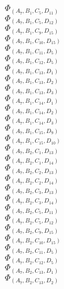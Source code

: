 \documentclass[14pt]{article}
\begin{document}
    $\Phi_{({A}_{7}, {B}_{1}, {C}_{5}, {D}_{11})}$ \\ 
    $\Phi_{({A}_{7}, {B}_{1}, {C}_{5}, {D}_{12})}$ \\ 
    $\Phi_{({A}_{7}, {B}_{1}, {C}_{9}, {D}_{15})}$ \\ 
    $\Phi_{({A}_{7}, {B}_{1}, {C}_{10}, {D}_{15})}$ \\ 
    $\Phi_{({A}_{7}, {B}_{1}, {C}_{11}, {D}_{5})}$ \\ 
    $\Phi_{({A}_{7}, {B}_{1}, {C}_{12}, {D}_{5})}$ \\ 
    $\Phi_{({A}_{7}, {B}_{1}, {C}_{13}, {D}_{1})}$ \\ 
    $\Phi_{({A}_{7}, {B}_{1}, {C}_{13}, {D}_{2})}$ \\ 
    $\Phi_{({A}_{7}, {B}_{1}, {C}_{13}, {D}_{3})}$ \\ 
    $\Phi_{({A}_{7}, {B}_{1}, {C}_{14}, {D}_{1})}$ \\ 
    $\Phi_{({A}_{7}, {B}_{1}, {C}_{14}, {D}_{2})}$ \\ 
    $\Phi_{({A}_{7}, {B}_{1}, {C}_{14}, {D}_{3})}$ \\ 
    $\Phi_{({A}_{7}, {B}_{1}, {C}_{15}, {D}_{9})}$ \\ 
    $\Phi_{({A}_{7}, {B}_{1}, {C}_{15}, {D}_{10})}$ \\ 
    $\Phi_{({A}_{7}, {B}_{2}, {C}_{1}, {D}_{13})}$ \\ 
    $\Phi_{({A}_{7}, {B}_{2}, {C}_{1}, {D}_{14})}$ \\ 
    $\Phi_{({A}_{7}, {B}_{2}, {C}_{2}, {D}_{13})}$ \\ 
    $\Phi_{({A}_{7}, {B}_{2}, {C}_{2}, {D}_{14})}$ \\ 
    $\Phi_{({A}_{7}, {B}_{2}, {C}_{3}, {D}_{13})}$ \\ 
    $\Phi_{({A}_{7}, {B}_{2}, {C}_{3}, {D}_{14})}$ \\ 
    $\Phi_{({A}_{7}, {B}_{2}, {C}_{5}, {D}_{11})}$ \\ 
    $\Phi_{({A}_{7}, {B}_{2}, {C}_{5}, {D}_{12})}$ \\ 
    $\Phi_{({A}_{7}, {B}_{2}, {C}_{9}, {D}_{15})}$ \\ 
    $\Phi_{({A}_{7}, {B}_{2}, {C}_{10}, {D}_{15})}$ \\ 
    $\Phi_{({A}_{7}, {B}_{2}, {C}_{11}, {D}_{5})}$ \\ 
    $\Phi_{({A}_{7}, {B}_{2}, {C}_{12}, {D}_{5})}$ \\ 
    $\Phi_{({A}_{7}, {B}_{2}, {C}_{13}, {D}_{1})}$ \\ 
    $\Phi_{({A}_{7}, {B}_{2}, {C}_{13}, {D}_{2})}$ \\ 
\end{document}
